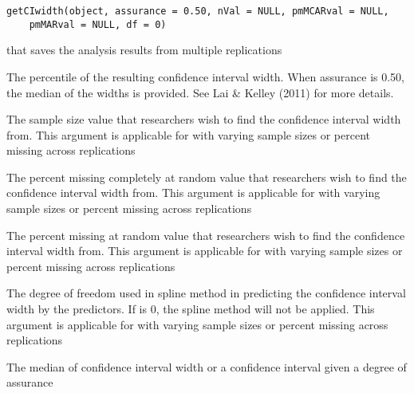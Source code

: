 \documentclass[a4paper]{book}
\begin{document}
%
\begin{Usage}
\begin{verbatim}
getCIwidth(object, assurance = 0.50, nVal = NULL, pmMCARval = NULL, 
	pmMARval = NULL, df = 0)
\end{verbatim}
\end{Usage}
%
\begin{Arguments}
\begin{ldescription}
\item[\code{object}] 
 that saves the analysis results from multiple replications

\item[\code{assurance}] 
The percentile of the resulting confidence interval width. When assurance is 0.50, the median of the widths is provided. See Lai \& Kelley (2011) for more details.

\item[\code{nVal}] 
The sample size value that researchers wish to find the confidence interval width from. This argument is applicable for  with varying sample sizes or percent missing across replications

\item[\code{pmMCARval}] 
The percent missing completely at random value that researchers wish to find the confidence interval width from. This argument is applicable for  with varying sample sizes or percent missing across replications

\item[\code{pmMARval}] 
The percent missing at random value that researchers wish to find the confidence interval width from. This argument is applicable for  with varying sample sizes or percent missing across replications

\item[\code{df}] 
The degree of freedom used in spline method in predicting the confidence interval width by the predictors. If  is 0, the spline method will not be applied. This argument is applicable for  with varying sample sizes or percent missing across replications

\end{ldescription}
\end{Arguments}
%
\begin{Value}
The median of confidence interval width or a confidence interval given a degree of assurance
\end{Value}
\end{document}
